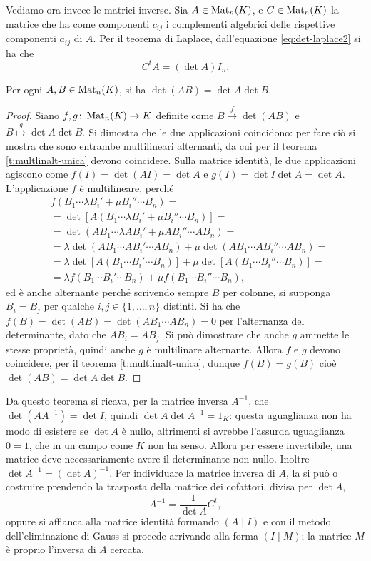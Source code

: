 Vediamo ora invece le matrici inverse.
Sia $A\in\operatorname{Mat}_n(K)$, e $C\in\operatorname{Mat}_n(K)$ la matrice che ha come componenti $c_{ij}$ i complementi algebrici delle rispettive componenti $a_{ij}$ di $A$.
Per il teorema di Laplace, dall'equazione \eqref{eq:det-laplace2} si ha che
\begin{equation}
	C^tA=(\det A)I_n.
\end{equation}

\begin{teorema}[di Binet]
	Per ogni $A,B\in\operatorname{Mat}_n(K)$, si ha $\det(AB)=\det A\det B$.
\end{teorema}
\begin{proof}
	Siano $f,g\colon\operatorname{Mat}_n(K)\to K$ definite come $B\overset{f}{\mapsto}\det(AB)$ e $B\overset{g}{\mapsto}\det A\det B$.
	Si dimostra che le due applicazioni coincidono: per fare ciò si mostra che sono entrambe multilineari alternanti, da cui per il teorema \ref{t:multlinalt-unica} devono coincidere.
	Sulla matrice identità, le due applicazioni agiscono come $f(I)=\det(AI)=\det A$ e $g(I)=\det I\det A=\det A$.
	L'applicazione $f$ è multilineare, perché
	\begin{align*}
		&f(B_1\cdots\lambda B_i'+\mu B_i''\cdots B_n)=\\
		&=\det[A(B_1\cdots\lambda B_i'+\mu B_i''\cdots B_n)]=\\
		&=\det(AB_1\cdots\lambda AB_i'+\mu AB_i''\cdots AB_n)=\\
		&=\lambda\det(AB_1\cdots AB_i'\cdots AB_n)+\mu\det(AB_1\cdots AB_i''\cdots AB_n)=\\
		&=\lambda\det[A(B_1\cdots B_i'\cdots B_n)]+\mu\det[A(B_1\cdots B_i''\cdots B_n)]=\\
		&=\lambda f(B_1\cdots B_i'\cdots B_n)+\mu f(B_1\cdots B_i''\cdots B_n),
	\end{align*}
	ed è anche alternante perché scrivendo sempre $B$ per colonne, si supponga $B_i=B_j$ per qualche $i,j\in\{1,\dots,n\}$ distinti.
	Si ha che $f(B)=\det(AB)=\det(AB_1\cdots AB_n)=0$ per l'alternanza del determinante, dato che $AB_i=AB_j$.
	Si può dimostrare che anche $g$ ammette le stesse proprietà, quindi anche $g$ è multilinare alternante.
	Allora $f$ e $g$ devono coincidere, per il teorema \ref{t:multlinalt-unica}, dunque $f(B)=g(B)$ cioè $\det(AB)=\det A\det B$.
\end{proof}
Da questo teorema si ricava, per la matrice inversa $A^{-1}$, che $\det(AA^{-1})=\det I$, quindi $\det A\det A^{-1}=1_K$: questa uguaglianza non ha modo di esistere se $\det A$ è nullo, altrimenti si avrebbe l'assurda uguaglianza $0=1$, che in un campo come $K$ non ha senso.
Allora per essere invertibile, una matrice deve necessariamente avere il determinante non nullo.
Inoltre $\det A^{-1}=(\det A)^{-1}$.
Per individuare la matrice inversa di $A$, la si può o costruire prendendo la trasposta della matrice dei cofattori, divisa per $\det A$,
\begin{equation*}
	A^{-1}=\frac1{\det A}C^t,
\end{equation*}
oppure si affianca alla matrice identità formando $(A\mid I)$ e con il metodo dell'eliminazione di Gauss si procede arrivando alla forma $(I\mid M)$; la matrice $M$ è proprio l'inversa di $A$ cercata.

